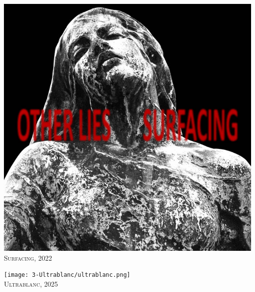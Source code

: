 \begin{titlepage}
\begin{minipage}[t]{0.33\textwidth}
    \includegraphics[width=0.98\linewidth]{2-Surfacing/surfacing.jpg}\\
    \vspace{2em}
    {\Large \scshape Surfacing, 2022}
  \end{minipage}%
  \begin{minipage}[t]{0.33\textwidth}
    \centering
    \texttt{[image: 3-Ultrablanc/ultrablanc.png]}\\
    \vspace{2em}
    {\Large \scshape Ultrablanc, 2025}
  \end{minipage}%
\end{titlepage}

\pagecolor{white}
\color{black}
